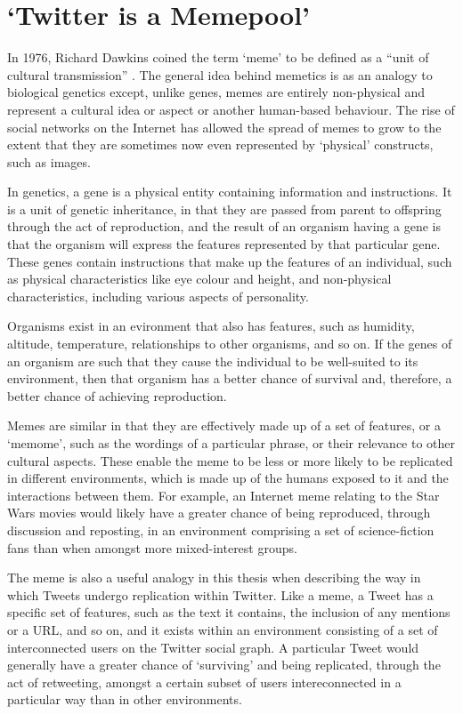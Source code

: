 \section{`Twitter is a Memepool'}
In 1976, Richard Dawkins coined the term `meme' to be defined as a ``unit of cultural transmission'' \cite{dawkins76}. The general idea behind memetics is as an analogy to biological genetics except, unlike genes, memes are entirely non-physical and represent a cultural idea or aspect or another human-based behaviour. The rise of social networks on the Internet has allowed the spread of memes to grow to the extent that they are sometimes now even represented by `physical' constructs, such as images.

In genetics, a gene is a physical entity containing information and instructions. It is a unit of genetic inheritance, in that they are passed from parent to offspring through the act of reproduction, and the result of an organism having a gene is that the organism will express the features represented by that particular gene. These genes contain instructions that make up the features of an individual, such as physical characteristics like eye colour and height, and non-physical characteristics, including various aspects of personality.

Organisms exist in an evironment that also has features, such as humidity, altitude, temperature, relationships to other organisms, and so on. If the genes of an organism are such that they cause the individual to be well-suited to its environment, then that organism has a better chance of survival and, therefore, a better chance of achieving reproduction.

Memes are similar in that they are effectively made up of a set of features, or a `memome', such as the wordings of a particular phrase, or their relevance to other cultural aspects. These enable the meme to be less or more likely to be replicated in different environments, which is made up of the humans exposed to it and the interactions between them. For example, an Internet meme relating to the Star Wars movies would likely have a greater chance of being reproduced, through discussion and reposting, in an environment comprising a set of science-fiction fans than when amongst more mixed-interest groups.

The meme is also a useful analogy in this thesis when describing the way in which Tweets undergo replication within Twitter. Like a meme, a Tweet has a specific set of features, such as the text it contains, the inclusion of any mentions or a URL, and so on, and it exists within an environment consisting of a set of interconnected users on the Twitter social graph. A particular Tweet would generally have a greater chance of `surviving' and being replicated, through the act of retweeting, amongst a certain subset of users intereconnected in a particular way than in other environments.

